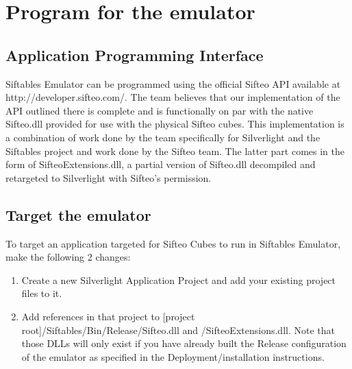 \documentclass[12pt]{article}
\begin{document}
\section{Program for the emulator}
\subsection{Application Programming Interface}
Siftables Emulator can be programmed using the official Sifteo API available at\\ http://developer.sifteo.com/. The team believes that our implementation of the API outlined there is complete and is functionally on par with the native Sifteo.dll provided for use with the physical Sifteo cubes. This implementation is a combination of work done by the team specifically for Silverlight and the Siftables project and work done by the Sifteo team. The latter part comes in the form of SifteoExtensions.dll, a partial version of Sifteo.dll decompiled and retargeted to Silverlight with Sifteo's permission.

\subsection{Target the emulator}
To target an application targeted for Sifteo Cubes to run in Siftables Emulator, make the following 2 changes:
\begin{enumerate}
\item Create a new Silverlight Application Project and add your existing project files to it.
\item Add references in that project to [project root]/Siftables/Bin/Release/Sifteo.dll and /SifteoExtensions.dll. Note that those DLLs will only exist if you have already built the Release configuration of the emulator as specified in the Deployment/installation instructions.
\end{enumerate}
\end{document}
